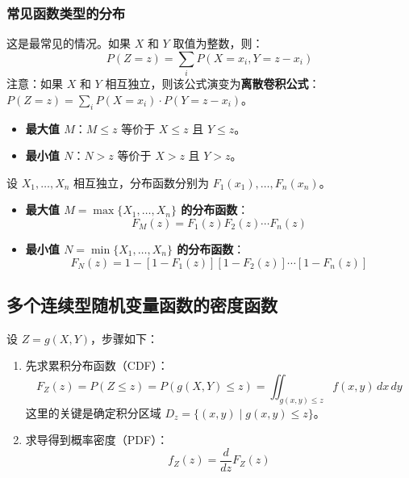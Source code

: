 \subsubsection{常见函数类型的分布}
\begin{definition}[和的分布：$Z = X + Y$]
这是最常见的情况。如果 $X$ 和 $Y$ 取值为整数，则：
\begin{equation}
	P(Z=z) = \sum_{i} P(X=x_i, Y=z-x_i)
	\label{eq:第三章:和分布律}
\end{equation}
注意：如果 $X$ 和 $Y$ 相互独立，则该公式演变为\textbf{离散卷积公式}：$P(Z=z) = \sum_{i} P(X=x_i)\cdot P(Y=z-x_i)$。
\end{definition}

\begin{theorem}[最值分布：$M = \max(X, Y)$ 与 $N = \min(X, Y)$]
\begin{itemize}
	\item \textbf{最大值 $M$}：$M \le z$ 等价于 $X \le z$ 且 $Y \le z$。
	\item \textbf{最小值 $N$}：$N > z$ 等价于 $X > z$ 且 $Y > z$。
\end{itemize}
设 $X_1, \ldots, X_n$ 相互独立，分布函数分别为 $F_1(x_1), \ldots, F_n(x_n)$。
\begin{itemize}
	\item \textbf{最大值 $M = \max\{X_1, \ldots, X_n\}$ 的分布函数}：
	\begin{equation}
		F_M(z) = F_1(z) F_2(z) \cdots F_n(z)
		\label{eq:第三章:最大值分布}
	\end{equation}
	\item \textbf{最小值 $N = \min\{X_1, \ldots, X_n\}$ 的分布函数}：
	\begin{equation}
		F_N(z) = 1 - [1 - F_1(z)][1 - F_2(z)] \cdots [1 - F_n(z)]
		\label{eq:第三章:最小值分布}
	\end{equation}
\end{itemize}
\end{theorem}

\subsection{多个连续型随机变量函数的密度函数}
\begin{theorem}
设 $Z = g(X, Y)$，步骤如下：
\begin{enumerate}
	\item 先求累积分布函数（CDF）：
	\begin{equation}
		F_Z(z) = P(Z \le z) = P(g(X, Y) \le z) = \iint_{g(x,y) \le z} f(x, y)\,dx\,dy
		\label{eq:第三章:CDF}
	\end{equation}
	这里的关键是确定积分区域 $D_z = \{ (x, y) \mid g(x, y) \le z \}$。
	\item 求导得到概率密度（PDF）：
	\begin{equation}
		f_Z(z) = \frac{d}{dz} F_Z(z)
		\label{eq:第三章:PDF}
	\end{equation}
\end{enumerate}
\end{theorem}

